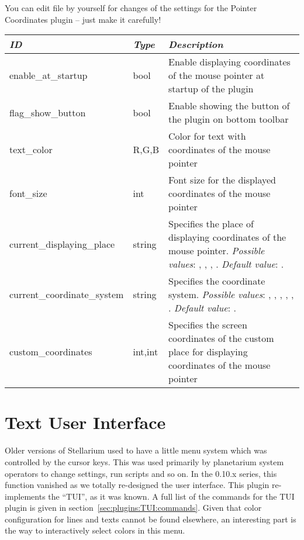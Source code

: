 You can edit  file by yourself for changes of the
settings for the Pointer Coordinates plugin -- just make it carefully!

\begin{longtabu} to \textwidth {l|l|X}\toprule
\emph{ID}            & \emph{Type} & \emph{Description}\\\midrule
enable\_at\_startup  & bool & Enable displaying coordinates of the mouse pointer at startup of the plugin\\\midrule
flag\_show\_button   & bool & Enable showing the button of the plugin on bottom toolbar\\\midrule
text\_color          & R,G,B & Color for text with coordinates of the mouse pointer \\\midrule
font\_size           & int & Font size for the displayed coordinates of the mouse pointer \\\midrule
current\_displaying\_place  & string & Specifies the place of displaying coordinates of the mouse pointer. \textit{Possible values}: , , , . \textit{Default value}: . \\\midrule
current\_coordinate\_system & string & Specifies the coordinate system. \textit{Possible values}: , , , , , . \textit{Default value}: . \\\midrule
custom\_coordinates  & int,int & Specifies the screen coordinates of the custom place for displaying coordinates of the mouse pointer \\\bottomrule
\end{longtabu}




\newpage

\section{Text User Interface}
\label{sec:plugins:TextUserInterface}


Older versions of Stellarium used to have a little menu system which
was controlled by the cursor keys. This was used primarily by
planetarium system operators to change settings, run scripts and so
on. In the 0.10.x series, this function vanished as we totally
re-designed the user interface. This plugin re-implements the ``TUI'',
as it was known. A full list of the commands for the TUI plugin is
given in section~\ref{sec:plugins:TUI:commands}. Given that color
configuration for lines and texts cannot be found elsewhere, an interesting part is the
way to interactively select colors in this menu.


